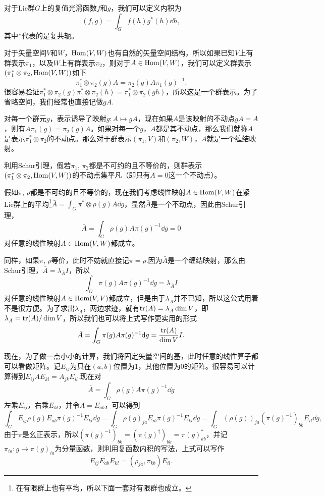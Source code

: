 \para 对于Lie群$G$上的复值光滑函数$f$和$g$，我们可以定义内积为
\[
	(f,g)=\int_G f(h)g^*(h)\dd h,
\]
其中$*$代表的是复共轭。

\para 对于矢量空间$V$和$W$，$\operatorname{Hom}(V,W)$也有自然的矢量空间结构，所以如果已知$V$上有群表示$\pi_1$，以及$W$上有群表示$\pi_2$，则对于$A\in \operatorname{Hom}(V,W)$，我们可以定义群表示$(\pi_1^*\otimes\pi_2,\operatorname{Hom}(V,W))$如下
\[
	\pi_1^*\otimes\pi_2(g)A=\pi_2(g)A\pi_1(g)^{-1}.
\]
很容易验证$\pi_1^*\otimes\pi_2(g)\pi_1^*\otimes\pi_2(h)=\pi_1^*\otimes\pi_2(gh)$，所以这是一个群表示。为了省略空间，我们经常也直接记做$gA$.

对每一个群元$g$，表示诱导了映射$g:A\mapsto gA$，现在如果$A$是该映射的不动点$gA=A$，则有$A\pi_1(g)=\pi_2(g)A$。如果对每一个$g$，$A$都是其不动点，那么我们就称$A$是表示$\pi_1^*\otimes\pi_2$的不动点。那么对于群表示$(\pi_1,V)$和$(\pi_2,W)$，$A$就是一个缠结映射。

\para 利用Schur引理，假若$\pi_1$, $\pi_2$都是不可约的且不等价的，则群表示$(\pi_1^*\otimes\pi_2,\operatorname{Hom}(V,W))$的不动点集平凡（即只有$A=0$这一个不动点）。

假如$\pi$, $\rho$都是不可约的且不等价的，现在我们考虑线性映射$A\in \operatorname{Hom}(V,W)$在紧Lie群上的平均\footnote{在有限群上也有平均，所以下面一套对有限群也成立。}$\bar{A}=\int_G \pi^*\otimes\rho(g)A \dd g$，显然$\bar{A}$是一个不动点，因此由Schur引理，
\[
	\bar{A}=\int_G \rho(g)A\pi(g)^{-1}\dd g=0
\]
对任意的线性映射$A\in \operatorname{Hom}(V,W)$都成立。

同样，如果$\pi$, $\rho$等价，此时不妨就直接记$\pi=\rho$.因为$\bar{A}$是一个缠结映射，那么由Schur引理，$\bar{A}=\lambda_{\bar{A}} I$，所以
\[
	\int_G \pi(g)A\pi(g)^{-1}\dd g=\lambda_{\bar{A}} I
\]
对任意的线性映射$A\in \operatorname{Hom}(V,V)$都成立，但是由于$\lambda_{\bar{A}}$并不已知，所以这公式用着不是很方便。为了求出$\lambda_{\bar{A}}$，两边求迹，就有$\operatorname{tr}(A)=\lambda_{\bar{A}} \dim V$，即$\lambda_{\bar{A}}=\operatorname{tr}(A)/\dim V$，所以我们也可以将上式写作更实用的形式
\[
	\bar{A}=\int_G \pi(g)A\pi(g)^{-1}\mathrm{d} g=\frac{\operatorname{tr}(A)}{\dim V}I.
\]

\para 现在，为了做一点小小的计算，我们将固定矢量空间的基，此时任意的线性算子都可以看做矩阵。记$E_{ij}$为只在$(a,b)$位置为1，其他位置为0的矩阵。很容易可以计算得到$E_{ij}AE_{kl}=A_{jk}E_{il}$.现在对
\[
	\bar{A}=\int_G \rho(g)A\pi(g)^{-1}\dd g
\]
左乘$E_{ij}$，右乘$E_{kl}$，并令$A=E_{ab}$，可以得到
\[
	\int_G E_{ij}\rho(g)E_{ab}\pi(g)^{-1}E_{kl}\dd g=\int_G \rho(g)_{ja}E_{ib}\pi(g)^{-1}E_{kl}\dd g=\int_G (\rho(g))_{ja}\left(\pi(g)^{-1}\right)_{bk}E_{il}\dd g,
\]
由于$\pi$是幺正表示，所以$\left(\pi(g)^{-1}\right)_{bk}=\left(\pi(g)^{\dag}\right)_{bk}=\pi(g)_{kb}^*$，并记$\pi_{ia}:g\to \pi(g)_{ia}$为分量函数，则利用复函数内积的写法，上式可以写作
\[
	E_{ij}\overline{E_{ab}}E_{kl}=\left(\rho_{ja},\pi_{kb}\right)E_{il}.
\]

